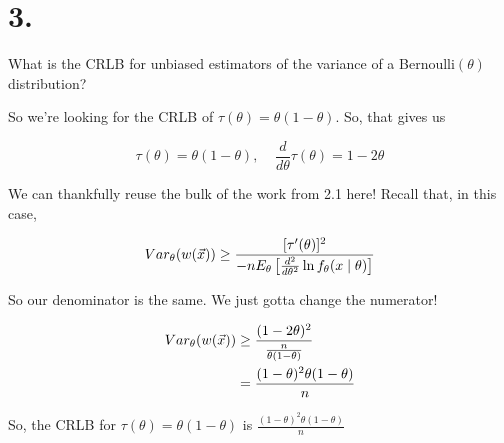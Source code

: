 \section*{3.}

What is the CRLB for unbiased estimators of the variance of a Bernoulli$(\theta)$ distribution?

So we're looking for the CRLB of $\tau(\theta) = \theta(1-\theta)$. So, that gives us

\[
	\tau(\theta) = \theta(1-\theta), \;\;\;\;
	\frac{d}{d\theta} \tau(\theta) = 1-2\theta
\]

We can thankfully reuse the bulk of the work from 2.1 here! Recall that, in this case,

\[
	Var_{\theta}(w(\vec{x})) \geq \frac{[\tau'(\theta)]^2}{-n E_{\theta}\left[ \frac{d^2}{d\theta^2} \ln f_{\theta}(x \mid \theta) \right]}
\]

So our denominator is the same. We just gotta change the numerator!

\begin{align*}
	Var_{\theta}(w(\vec{x})) &\geq \frac{(1-2\theta)^2}{\frac{n}{\theta(1-\theta)}} \\
	&= \frac{(1-\theta)^2 \theta(1-\theta)}{n}
\end{align*}

So, the CRLB for $\tau(\theta) = \theta(1-\theta)$ is $\frac{(1-\theta)^2 \theta(1-\theta)}{n}$
